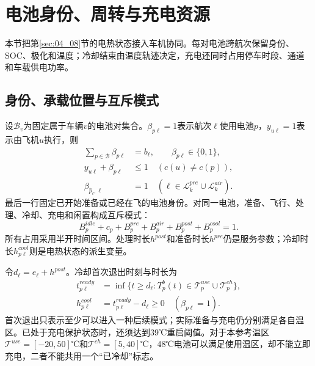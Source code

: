 \section{电池身份、周转与充电资源}
\label{sec:05_05}

本节把第\ref{sec:04_08}节的电热状态接入车机协同。每对电池跨航次保留身份、SOC、极化和温度；冷却结束由温度轨迹决定，充电还同时占用停车时段、通道和车载供电功率。

\subsection{身份、承载位置与互斥模式}

设$\mathcal B_v$为固定属于车辆$v$的电池对集合。$\beta_{p\ell}=1$表示航次$\ell$使用电池$p$，$y_{u\ell}=1$表示由飞机$u$执行，则
\begin{align}
 \sum_{p\in\mathcal B}\beta_{p\ell}&=b_\ell,\qquad \beta_{p\ell}\in\{0,1\},\\
 y_{u\ell}+\beta_{p\ell}&\le1\quad(c(u)\ne c(p)),\\
 \beta_{\widehat p_\ell,\ell}&=1\quad(\ell\in\mathcal L_k^{pre}\cup\mathcal L_k^{air}).
 \label{s0505:committed_identity}
\end{align}
最后一行固定已开始准备或已经在飞的电池身份。对同一电池，准备、飞行、处理、冷却、充电和闲置构成互斥模式：
\begin{equation}
 B_p^{idle}+c_p+B_p^{pre}+B_p^{air}+B_p^{post}+B_p^{cool}=1.
 \label{s0505:unique_mode}
\end{equation}
所有占用采用半开时间区间。处理时长$h^{post}$和准备时长$h^{pre}$仍是服务参数；冷却时长$h_{p\ell}^{cool}$则是电热状态的派生变量。

令$d_\ell=e_\ell+h^{post}$。冷却首次退出时刻与时长为
\begin{align}
 t_{p\ell}^{ready}&=\inf\{t\ge d_\ell:T_p^b(t)\in\mathcal T_p^{use}\cup\mathcal T_p^{ch}\},\\
 h_{p\ell}^{cool}&=t_{p\ell}^{ready}-d_\ell\ge0\quad(\beta_{p\ell}=1).
 \label{s0505:thermal_release}
\end{align}
首次退出只表示至少可以进入一种后续模式；实际准备与充电仍分别满足各自温区。已处于充电保护状态时，还须达到39℃重启阈值。对于本参考温区$\mathcal T^{use}=[-20,50]$℃和$\mathcal T^{ch}=[5,40]$℃，48℃电池可以满足使用温区，却不能立即充电，二者不能共用一个“已冷却”标志。

